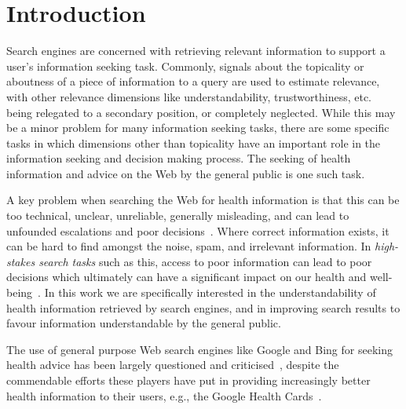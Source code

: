 
\section{Introduction}
\label{chp:understanding_understandability}

Search engines are concerned with retrieving relevant information to support a user's information seeking task. Commonly, signals about the topicality or aboutness of a piece of information to a query are used to estimate relevance, with other relevance dimensions like understandability, trustworthiness, etc.~\cite{} being relegated to a secondary position, or completely neglected. While this may be a minor problem for many information seeking tasks, there are some specific tasks in which dimensions other than topicality have an important role in the information seeking and decision making process. The seeking of health information and advice on the Web by the general public is one such task. 

A key problem when searching the Web for health information is that this can be too technical, unclear, unreliable, generally misleading, and can lead to unfounded escalations and poor decisions~\cite{white09b}. Where correct information exists, it can be hard to find amongst the noise, spam, and irrelevant information. In \textit{high-stakes search tasks} such as this, access to poor information can lead to poor decisions which ultimately can have a significant impact on our health and well-being~\cite{white09b,white13}. In this work we are specifically interested in the understandability of health information retrieved by search engines, and in improving search results to favour information understandable by the general public. 

The use of general purpose Web search engines like Google and Bing for seeking health advice has been largely questioned and criticised~\cite{graber99readability,fitzsimmons2010readability,wiener2013readability,patel13readability,atcherson14readability,meillier17readability}, despite the commendable efforts these players have put in providing increasingly better health information to their users, e.g., the Google Health Cards~\cite{}. 

